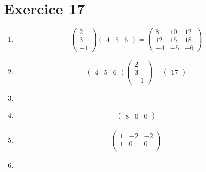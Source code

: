 \part{Exercice 17}

\begin{enumerate}
	\item \[
			\begin{pmatrix}
				2\\
				3\\
				-1
			\end{pmatrix} \begin{pmatrix}
			4&5&6
			\end{pmatrix} = \begin{pmatrix}
			8&10&12\\
			12&15&18\\
			-4&-5&-6
			\end{pmatrix} 
		\]
	\item
		\begin{align*}
			\begin{pmatrix}
				4&5&6
			\end{pmatrix}
			\begin{pmatrix}
				2\\3\\-1
			\end{pmatrix}=\begin{pmatrix}
				17
			\end{pmatrix}
		\end{align*}
	\item \danger
	\item
		\begin{align*}
			\begin{pmatrix}
				8&6&0
			\end{pmatrix}
		\end{align*}
	\item
		\begin{align*}
			\begin{pmatrix}
				1&-2&-2\\
				1&0&0\\
			\end{pmatrix} 
		\end{align*}
	\item \danger
\end{enumerate}
